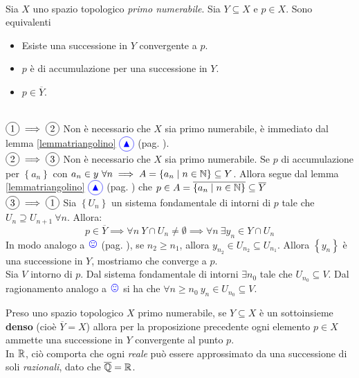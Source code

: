 \begin{proposition}~{}\\
	Sia $X$ uno spazio topologico \textit{primo numerabile}. Sia $Y\subseteq X$ e $p\in X$. Sono equivalenti
	\begin{itemize}
		\item Esiste una successione in $Y$ convergente a $p$.
		\item $p$ è di accumulazione per una successione in $Y$.
		\item $p\in \overline{Y}$.
	\end{itemize}
\vspace{-3mm}
\end{proposition}
\begin{demonstration}~{}\\
$\circled{1}\implies\circled{2}$ Non è necessario che $X$ sia primo numerabile, è immediato dal lemma \ref{lemmatriangolino} $\textcolor{blue}{\circled{{\large \blacktriangle}}}$ (pag. \pageref{lemmatriangolino}).\\
$\circled{2}\implies\circled{3}$ Non è necessario che $X$ sia primo numerabile. Se $p$ di accumulazione per $\left\{a_n\right\}$ con $a_n\in y\ \forall n\implies A=\left\{a_n\mid n\in \mathbb{N}\right\}\subseteq Y$. Allora segue dal lemma \ref{lemmatriangolino} $\textcolor{blue}{\circled{{\large \blacktriangle}}}$ (pag. \pageref{lemmatriangolino}) che $p\in A=\overline{\left\{a_n\mid n\in \mathbb{N}\right\}}\subseteq \overline{Y}$ \\
$\circled{3}\implies\circled{1}$ Sia $\left\{U_n\right\}$ un sistema fondamentale di intorni di $p$ tale che $U_n\supseteq U_{n+1}\ \forall n$. Allora:
\begin{equation*}
	p\in \overline{Y}\implies \forall n\ Y\cap U_n\neq\emptyset\implies\forall n\ \exists y_n\in Y\cap U_n
\end{equation*}
In modo analogo a $\textcolor{blue}{{\large \smiley{}}}$ (pag. \pageref{notasorridente}), se $n_2\geq n_1$, allora $y_{n_2}\in U_{n_2}\subseteq U_{n_1}$. Allora $\left\{y_n\right\}$ è una successione in $Y$, mostriamo che converge a $p$.\\
Sia $V$ intorno di $p$. Dal sistema fondamentale di intorni $\exists n_0$ tale che $U_{n_0}\subseteq V$. Dal ragionamento analogo a $\textcolor{blue}{{\large \smiley{}}}$ si ha che $\forall n\geq n_0\ y_n\in U_{n_0}\subseteq V$.
\end{demonstration}
\begin{observe}\label{densitaesuccessioni}
	Preso uno spazio topologico $X$ primo numerabile, se $Y\subseteq X$ è un sottoinsieme \textbf{denso} (cioè $\overline{Y}=X$) allora per la proposizione precedente ogni elemento $p\in X$ ammette una successione in $Y$ convergente al punto $p$.\\
	In $\mathbb{R}$, ciò comporta che ogni \textit{reale} può essere approssimato da una successione di soli \textit{razionali}, dato che $\overline{\mathbb{Q}}=\mathbb{R}$.
\end{observe}
